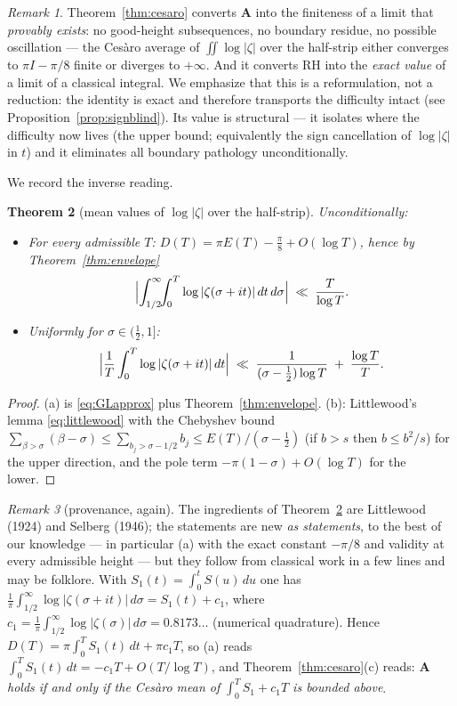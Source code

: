 \documentclass[11pt]{amsart}
\theoremstyle{plain}
\newtheorem{theorem}{Theorem}[section]
\theoremstyle{definition}
\theoremstyle{remark}
\newtheorem{remark}[theorem]{Remark}
\newcommand{\RH}{\mathrm{RH}}
\newcommand{\Aax}{\mathbf{A}}
\begin{document}
\begin{remark}\label{rem:cesaroreading}
Theorem~\ref{thm:cesaro} converts $\Aax$ into the finiteness of a limit that \emph{provably exists}: no good-height subsequences, no boundary residue, no possible oscillation --- the Ces\`aro average of $\iint\log|\zeta|$ over the half-strip either converges to $\pi I-\pi/8$ finite or diverges to $+\infty$. And it converts $\RH$ into the \emph{exact value} of a limit of a classical integral. We emphasize that this is a reformulation, not a reduction: the identity is exact and therefore transports the difficulty intact (see Proposition~\ref{prop:signblind}). Its value is structural --- it isolates where the difficulty now lives (the upper bound; equivalently the sign cancellation of $\log|\zeta|$ in $t$) and it eliminates all boundary pathology unconditionally.
\end{remark}

We record the inverse reading.

\begin{theorem}[mean values of $\log|\zeta|$ over the half-strip]\label{thm:inverse}
Unconditionally:
\begin{itemize}
\item[\textup{(a)}] For every admissible $T$: $D(T)=\pi E(T)-\frac\pi8+O(\log T)$, hence by Theorem~\ref{thm:envelope}
\[
\Bigl|\int_{1/2}^\infty\!\!\int_0^T\log|\zeta(\sigma+it)|\,dt\,d\sigma\Bigr|\;\ll\;\frac{T}{\log T}.
\]
\item[\textup{(b)}] Uniformly for $\sigma\in(\tfrac12,1]$:
\[
\Bigl|\frac1T\int_0^T\log|\zeta(\sigma+it)|\,dt\Bigr|\;\ll\;\frac1{(\sigma-\frac12)\log T}\;+\;\frac{\log T}{T}.
\]
\end{itemize}
\end{theorem}

\begin{proof}
(a) is \eqref{eq:GLapprox} plus Theorem~\ref{thm:envelope}. (b): Littlewood's lemma \eqref{eq:littlewood} with the Chebyshev bound $\sum_{\beta>\sigma}(\beta-\sigma)\le\sum_{b_j>\sigma-1/2}b_j\le E(T)/(\sigma-\tfrac12)$ (if $b>s$ then $b\le b^2/s$) for the upper direction, and the pole term $-\pi(1-\sigma)+O(\log T)$ for the lower.
\end{proof}

\begin{remark}[provenance, again]
The ingredients of Theorem~\ref{thm:inverse} are Littlewood (1924) and Selberg (1946); the statements are new \emph{as statements}, to the best of our knowledge --- in particular (a) with the exact constant $-\pi/8$ and validity at every admissible height --- but they follow from classical work in a few lines and may be folklore. With $S_1(t)=\int_0^t S(u)\,du$ \cite[\S9.9]{Titchmarsh1986} one has $\frac1\pi\int_{1/2}^\infty\log|\zeta(\sigma+it)|\,d\sigma=S_1(t)+c_1$, where $c_1=\frac1\pi\int_{1/2}^\infty\log|\zeta(\sigma)|\,d\sigma=0.8173\ldots$ (numerical quadrature). Hence $D(T)=\pi\int_0^TS_1(t)\,dt+\pi c_1T$, so (a) reads $\int_0^TS_1(t)\,dt=-c_1T+O(T/\log T)$, and Theorem~\ref{thm:cesaro}(c) reads: \emph{$\Aax$ holds if and only if the Ces\`aro mean of $\int_0^TS_1+c_1T$ is bounded above}.
\end{remark}
\end{document}
